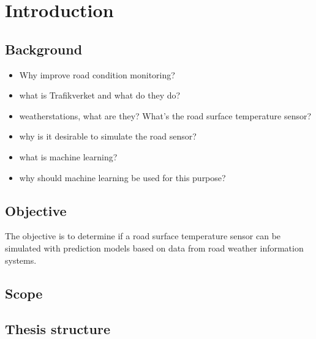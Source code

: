 \chapter{Introduction}
\section{Background}
\begin{itemize}
	\item Why improve road condition monitoring?
	\item what is Trafikverket and what do they do? 
	\item weatherstations, what are they? What's the road surface temperature sensor?
	\item why is it desirable to simulate the road sensor?
	\item what is machine learning?
	\item why should machine learning be used for this purpose?
\end{itemize}

\section{Objective}
	The objective is to determine if a road surface temperature sensor can be simulated with prediction models based on data from road weather information systems.
\section{Scope}

\section{Thesis structure}
